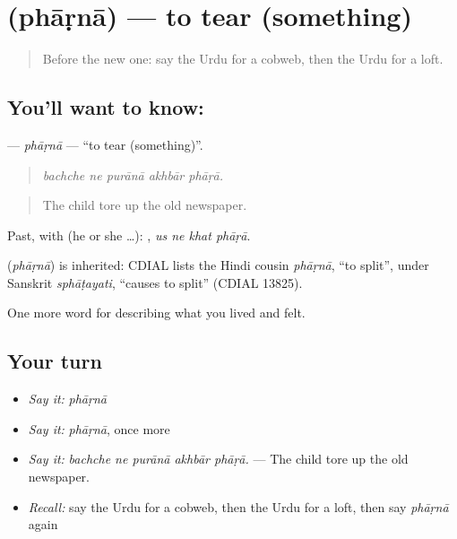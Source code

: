 \section[\texorpdfstring{\ur{پھاڑنا} (phāṛnā)}{پھاڑنا (phāṛnā)}]{ (phāṛnā) — to tear (something)}

\label{lesson:UR-C505-pharna}



\begin{quote}
Before the new one: say the Urdu for a cobweb, then the Urdu for a loft.
\end{quote}

\subsection*{You'll want to know: }
\textbf{} — \emph{phāṛnā} — \textquotedblleft{}to tear (something)\textquotedblright{}.

\begin{quote}
    
\end{quote}

\begin{quote}
\emph{bachche ne purānā akhbār phāṛā.}
\end{quote}

\begin{quote}
The child tore up the old newspaper.
\end{quote}

Past, with  (he or she …):    , \emph{us ne khat phāṛā}.

\begin{cousinweb}
\textbf{} (\emph{phāṛnā}) is inherited: CDIAL lists the Hindi cousin \emph{phāṛnā}, \textquotedblleft{}to split\textquotedblright{}, under Sanskrit \emph{sphāṭayati}, \textquotedblleft{}causes to split\textquotedblright{} (CDIAL 13825).
\end{cousinweb}

\begin{grammarlens}[title={What you've built}]
One more word for describing what you lived and felt.
\end{grammarlens}

\subsection*{Your turn}
\begin{itemize}
\raggedright
  \item \emph{Say it:} \emph{phāṛnā}
  \item \emph{Say it:} \emph{phāṛnā}, once more
  \item \emph{Say it:} \emph{bachche ne purānā akhbār phāṛā.} — The child tore up the old newspaper.
  \item \emph{Recall:} say the Urdu for a cobweb, then the Urdu for a loft, then say \emph{phāṛnā} again
\end{itemize}

